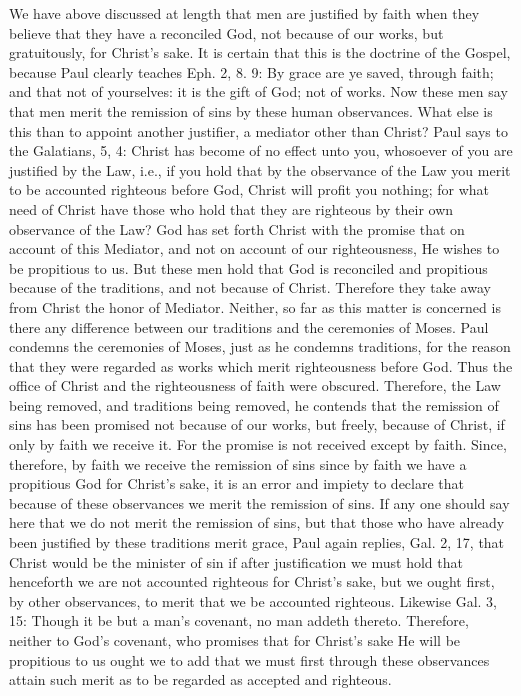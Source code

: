 We have above discussed at length that men are justified by faith
when they believe that they have a reconciled God, not because of our
works, but gratuitously, for Christ's sake.  It is certain that this
is the doctrine of the Gospel, because Paul clearly teaches Eph. 2, 8.
9: By grace are ye saved, through faith; and that not of yourselves:
it is the gift of God; not of works.  Now these men say that men
merit the remission of sins by these human observances.  What else is
this than to appoint another justifier, a mediator other than Christ?
Paul says to the Galatians, 5, 4: Christ has become of no effect
unto you, whosoever of you are justified by the Law, i.e., if you
hold that by the observance of the Law you merit to be accounted
righteous before God, Christ will profit you nothing; for what need
of Christ have those who hold that they are righteous by their own
observance of the Law?  God has set forth Christ with the promise
that on account of this Mediator, and not on account of our
righteousness, He wishes to be propitious to us.  But these men hold
that God is reconciled and propitious because of the traditions, and
not because of Christ.  Therefore they take away from Christ the
honor of Mediator.  Neither, so far as this matter is concerned is
there any difference between our traditions and the ceremonies of
Moses.  Paul condemns the ceremonies of Moses, just as he condemns
traditions, for the reason that they were regarded as works which
merit righteousness before God.  Thus the office of Christ and the
righteousness of faith were obscured.  Therefore, the Law being
removed, and traditions being removed, he contends that the remission
of sins has been promised not because of our works, but freely,
because of Christ, if only by faith we receive it.  For the promise
is not received except by faith.  Since, therefore, by faith we
receive the remission of sins since by faith we have a propitious God
for Christ's sake, it is an error and impiety to declare that because
of these observances we merit the remission of sins.  If any one
should say here that we do not merit the remission of sins, but that
those who have already been justified by these traditions merit grace,
Paul again replies, Gal. 2, 17, that Christ would be the minister of
sin if after justification we must hold that henceforth we are not
accounted righteous for Christ's sake, but we ought first, by other
observances, to merit that we be accounted righteous.  Likewise Gal.
3, 15: Though it be but a man's covenant, no man addeth thereto.
Therefore, neither to God's covenant, who promises that for Christ's
sake He will be propitious to us ought we to add that we must first
through these observances attain such merit as to be regarded as
accepted and righteous.

